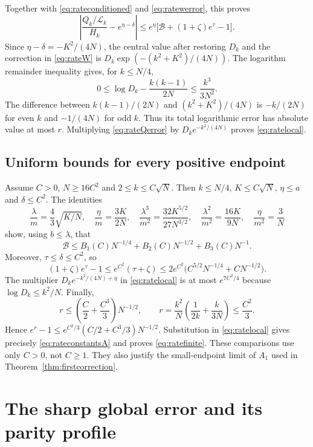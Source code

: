 \documentclass[11pt]{article}
\theoremstyle{definition}
\theoremstyle{remark}
\newcommand{\1}{\mathbf 1}
\begin{document}
Together with \eqref{eq:rateconditioned} and \eqref{eq:ratewerror}, this proves
\begin{equation}\label{eq:rateQerror}
\left|\frac{Q_k/\mathcal L_k}{H_k}-e^{\eta-\delta}\right|
\le e^\eta\bigl[\mathcal B+(1+\zeta)e^\tau-1\bigr].
\end{equation}
Since $\eta-\delta=-K^2/(4N)$, the central value after restoring $D_k$ and the correction in \eqref{eq:rateW} is
$D_k\exp(-(k^2+K^2)/(4N))$.
The logarithm remainder inequality gives, for $k\le N/4$,
\[
0\le\log D_k-\frac{k(k-1)}{2N}\le\frac{k^3}{3N^2}.
\]
The difference between $k(k-1)/(2N)$ and $(k^2+K^2)/(4N)$ is $-k/(2N)$ for even $k$ and $-1/(4N)$ for odd $k$. Thus its total logarithmic error has absolute value at most $r$. Multiplying \eqref{eq:rateQerror} by $D_ke^{-k^2/(4N)}$ proves \eqref{eq:ratelocal}.

\subsection{Uniform bounds for every positive endpoint}

Assume $C>0$, $N\ge16C^2$ and $2\le k\le C\sqrt N$. Then $k\le N/4$, $K\le C\sqrt N$, $\eta\le a$ and $\delta\le C^2$. The identities
\[
\frac\lambda m=\frac43\sqrt{K/N},\quad
\frac\eta m=\frac{3K}{2N},\quad
\frac{\lambda^3}{m^2}=\frac{32K^{5/2}}{27N^{3/2}},\quad
\frac{\lambda^2}{m^2}=\frac{16K}{9N},\quad
\frac\eta{m^2}=\frac3N
\]
show, using $b\le\lambda$, that
\[
\mathcal B\le B_1(C)N^{-1/4}+B_2(C)N^{-1/2}+B_3(C)N^{-1}.
\]
Moreover, $\tau\le\delta\le C^2$, so
\[
(1+\zeta)e^\tau-1
\le e^{C^2}(\tau+\zeta)
\le2e^{C^2}\bigl(C^{5/2}N^{-1/4}+CN^{-1/2}\bigr).
\]
The multiplier $D_ke^{-k^2/(4N)+\eta}$ in \eqref{eq:ratelocal} is at most $e^{7C^2/4}$ because $\log D_k\le k^2/N$. Finally,
\[
r\le\left(\frac C2+\frac{C^3}{3}\right)N^{-1/2},\qquad
r=\frac{k^2}{N}\left(\frac1{2k}+\frac{k}{3N}\right)\le\frac{C^2}{3}.
\]
Hence $e^r-1\le e^{C^2/3}(C/2+C^3/3)N^{-1/2}$. Substitution in \eqref{eq:ratelocal} gives precisely \eqref{eq:rateconstantsA} and proves \eqref{eq:ratefinite}. These comparisons use only $C>0$, not $C\ge1$. They also justify the small-endpoint limit of $A_1$ used in Theorem~\ref{thm:firstcorrection}.


\section{The sharp global error and its parity profile}\label{sec:globalsharpproof}
\end{document}
